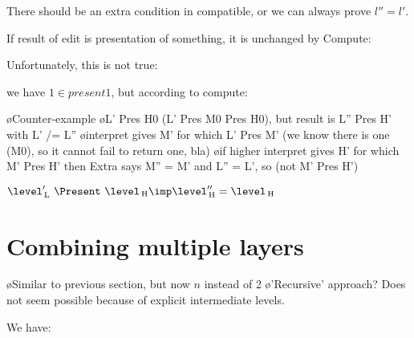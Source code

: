 There should be an extra condition in compatible, or we can always prove $l''=l'$.


If result of edit is presentation of something, it is unchanged by {\sc Compute}: 


Unfortunately, this is not true:


we have $1 \in present 1$, but according to compute: 


\bl
\o Counter-example
\o L' Pres H0 (L' Pres M0 Pres H0), but result is L'' Pres H' with L' /= L''
\o interpret gives M' for which L' Pres M' (we know there is one (M0), so it cannot fail to return one, bla)
\o if higher interpret gives H' for which M' Pres H' then Extra says M'' = M' and L'' = L', so (not M' Pres H')
\el


$\level'\L ~\Present~\level\H \imp \level''\H = \level\H$\\







\bc
%																
%																
%																
\section{Combining multiple layers}

\bl
\o Similar to previous section, but now $n$ instead of 2
\o 'Recursive' approach? Does not seem possible because of explicit intermediate levels.
\el

We have:



